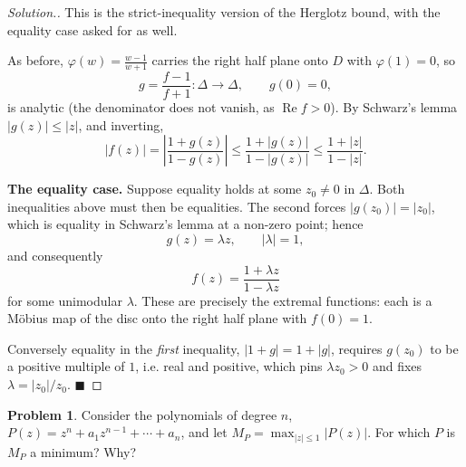 \documentclass[11pt,a4paper]{article}
\theoremstyle{definition}
\newtheorem{problemx}{Problem}[section]
\newenvironment{problem}{\begin{problemx}}{\end{problemx}}
\newenvironment{solution}
  {\renewcommand{\qedsymbol}{}\begin{proof}[\textit{Solution}.]}
  {\end{proof}}
\begin{document}
\begin{solution}
This is the strict-inequality version of the Herglotz bound, with the equality case
asked for as well.

As before, $\varphi(w) = \frac{w-1}{w+1}$ carries the right half plane onto $D$
with $\varphi(1) = 0$, so
$$g = \frac{f-1}{f+1} : \Delta \rightarrow \Delta,\qquad g(0) = 0 ,$$
is analytic (the denominator does not vanish, as $\operatorname{Re}f > 0$). By
Schwarz's lemma $\left|g(z)\right| \leq \left|z\right|$, and inverting,
$$\left|f(z)\right| = \left|\frac{1+g(z)}{1-g(z)}\right|
\leq \frac{1+\left|g(z)\right|}{1-\left|g(z)\right|}
\leq \frac{1+\left|z\right|}{1-\left|z\right|}.$$

\textbf{The equality case.} Suppose equality holds at some
$z_0 \neq 0$ in $\Delta$. Both inequalities above must then be equalities. The
second forces $\left|g(z_0)\right| = \left|z_0\right|$, which is equality in
Schwarz's lemma at a non-zero point; hence
$$g(z) = \lambda z, \qquad \left|\lambda\right| = 1 ,$$
and consequently
$$f(z) = \frac{1+\lambda z}{1 - \lambda z}$$
for some unimodular $\lambda$. These are precisely the extremal functions: each is
a M\"obius map of the disc onto the right half plane with $f(0) = 1$.

Conversely equality in the \emph{first} inequality, $\left|1+g\right| =
1+\left|g\right|$, requires $g(z_0)$ to be a positive multiple of $1$, i.e. real
and positive, which pins $\lambda z_0 > 0$ and fixes $\lambda = \left|z_0\right|/z_0$.
$\blacksquare$
\end{solution}


\begin{problem}
Consider the polynomials of degree $n$,
$P(z) = z^{n} + a_1 z^{n-1} + \cdots + a_n$, and let
$M_P = \max_{\left|z\right| \leq 1}\left|P(z)\right|$. For which $P$ is $M_P$ a
minimum? Why?
\end{problem}
\end{document}
